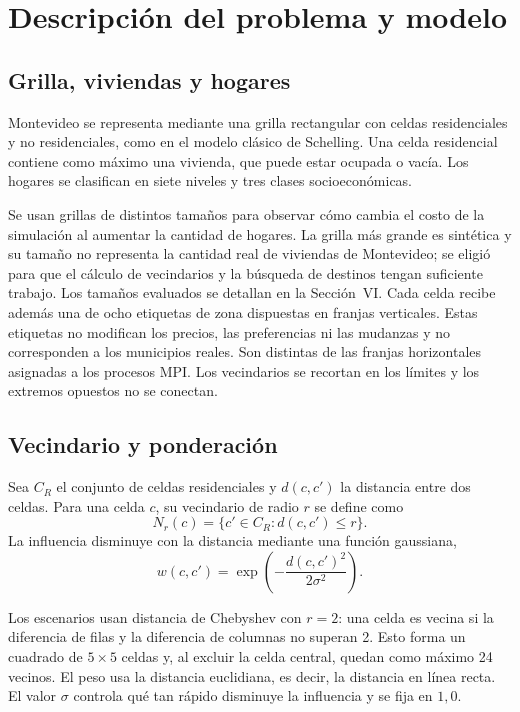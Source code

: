 \section{Descripción del problema y modelo}

\subsection{Grilla, viviendas y hogares}

Montevideo se representa mediante una grilla rectangular con celdas residenciales y no residenciales, como en el modelo clásico de Schelling. Una celda residencial contiene como máximo una vivienda, que puede estar ocupada o vacía. Los hogares se clasifican en siete niveles y tres clases socioeconómicas.

Se usan grillas de distintos tamaños para observar cómo cambia el costo de la simulación al aumentar la cantidad de hogares. La grilla más grande es sintética y su tamaño no representa la cantidad real de viviendas de Montevideo; se eligió para que el cálculo de vecindarios y la búsqueda de destinos tengan suficiente trabajo. Los tamaños evaluados se detallan en la Sección~VI. Cada celda recibe además una de ocho etiquetas de zona dispuestas en franjas verticales. Estas etiquetas no modifican los precios, las preferencias ni las mudanzas y no corresponden a los municipios reales. Son distintas de las franjas horizontales asignadas a los procesos MPI. Los vecindarios se recortan en los límites y los extremos opuestos no se conectan.

\subsection{Vecindario y ponderación}

Sea $C_R$ el conjunto de celdas residenciales y $d(c,c')$ la distancia entre dos celdas. Para una celda $c$, su vecindario de radio $r$ se define como
\begin{equation}
N_r(c)=\{c'\in C_R : d(c,c')\leq r\}.
\end{equation}
La influencia disminuye con la distancia mediante una función gaussiana,
\begin{equation}
w(c,c')=\exp\left(-\frac{d(c,c')^2}{2\sigma^2}\right).
\end{equation}

Los escenarios usan distancia de Chebyshev con $r=2$: una celda es vecina si la diferencia de filas y la diferencia de columnas no superan 2. Esto forma un cuadrado de $5\times5$ celdas y, al excluir la celda central, quedan como máximo 24 vecinos. El peso usa la distancia euclidiana, es decir, la distancia en línea recta. El valor $\sigma$ controla qué tan rápido disminuye la influencia y se fija en $1{,}0$.

